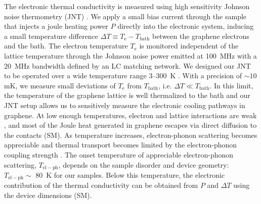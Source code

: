 \documentclass[10pt, oneside]{book}
\begin{document}
\begin{doublespace}
The electronic thermal conductivity is measured using high sensitivity Johnson noise thermometry (JNT) \cite{fong, crossno2}. We apply a small bias current through the sample that injects a joule heating power $P$ directly into the electronic system, inducing a small temperature difference $\Delta T\equiv T_{\mathrm{e}}-T_{\mathrm{bath}}$ between the graphene electrons and the bath. The electron temperature $T_{\mathrm{e}}$ is monitored independent of the lattice temperature through the Johnson noise power emitted at 100~MHz with a 20~MHz bandwidth defined by an LC matching network. We designed our JNT to be operated over a wide temperature range 3--300~K \cite{crossno2}. With a precision of $\sim 10$ mK, we measure small deviations of $T_{\mathrm{e}}$ from $T_{\mathrm{bath}}$, i.e. $\Delta T\ll T_{\mathrm{bath}}$. In this limit, the temperature of the graphene lattice is well thermalized to the bath \cite{fong} and our JNT setup allows us to sensitively measure the electronic cooling pathways in graphene. At low enough temperatures, electron and lattice interactions are weak \cite{crossno2, fong2}, and most of the Joule heat generated in graphene escapes via direct diffusion to the contacts (SM). As temperature increases, electron-phonon scattering becomes appreciable and thermal transport becomes limited by the electron-phonon coupling strength \cite{fong2, betz, McKitterick:2015vc}. The onset temperature of appreciable electron-phonon scattering, $T_{\mathrm{el-ph}}$, depends on the sample disorder and device geometry: $T_{\mathrm{el-ph}}\sim$ 80~K \cite{fong2, crossno2, yigen, laitinen} for our samples. Below this temperature, the electronic contribution of the thermal conductivity can be obtained from $P$ and $\Delta T$ using the device dimensions (SM).


\end{doublespace}
\end{document}
